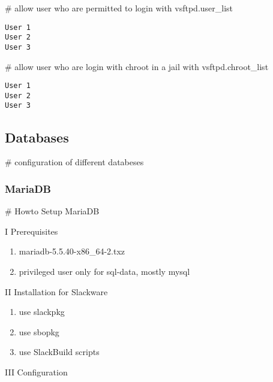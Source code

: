 \documentclass[letterpaper,10pt,english]{sphinxmanual}
\begin{document}
\# allow user who are permitted to login with vsftpd.user\_list

\begin{Verbatim}[commandchars=\\\{\}]
User 1
User 2
User 3
\end{Verbatim}

\# allow user who are login with chroot in a jail with vsftpd.chroot\_list

\begin{Verbatim}[commandchars=\\\{\}]
User 1
User 2
User 3
\end{Verbatim}


\subsection{Databases}
\label{sdocs/databases/databases::doc}\label{sdocs/databases/databases:databases}
\# configuration of different databeses


\subsubsection{MariaDB}
\label{sdocs/databases/mariadb/mariadb:mariadb}\label{sdocs/databases/mariadb/mariadb::doc}
\# Howto Setup MariaDB

I Prerequisites
\begin{enumerate}
\item {} 
mariadb-5.5.40-x86\_64-2.txz

\item {} 
privileged user only for sql-data, mostly mysql

\end{enumerate}

II Installation for Slackware
\begin{enumerate}
\item {} 
use slackpkg

\item {} 
use sbopkg

\item {} 
use SlackBuild scripts

\end{enumerate}

III Configuration
\end{document}
